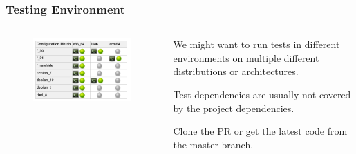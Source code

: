 \documentclass[aspectratio=169]{beamer}
\begin{document}
\begin{frame}
	\frametitle{Testing Environment}

\begin{columns}
\begin{column}{0.5\textwidth}
	\begin{figure}[ht!]
	\begin{center}
  	  \includegraphics[width=\textwidth]{img/ci-matrix.png}
	\end{center}
	\end{figure}
\end{column}
\begin{column}{0.5\textwidth}
\begin{block}{\color{orange}{1. Preparation of VMs/containers to run the tests}}
   		\vspace{1mm}
We might want to run tests in different environments on multiple different distributions or architectures.
     \end{block}
      \begin{block}{\color{orange}{2. Installation of the test dependencies}}
   		\vspace{1mm}
Test dependencies are usually not covered by the project dependencies.
     \end{block}
      \begin{block}{\color{orange}{3. Getting the code}}
   		\vspace{1mm}
Clone the PR or get the latest code from the master branch.
     \end{block}
\end{column}
\end{columns}
\end{frame}
\end{document}
